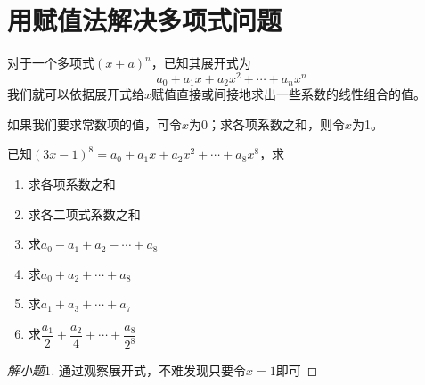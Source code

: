 \section[多项式问题]{用赋值法解决多项式问题}
对于一个多项式$(x+a)^n$，已知其展开式为\[a_0+a_1x+a_2x^2+\cdots+a_nx^n\]我们就可以依据展开式给$x$赋值直接或间接地求出一些系数的线性组合的值。

如果我们要求常数项的值，可令$x$为0；求各项系数之和，则令$x$为1。

\begin{example}
	已知$(3x-1)^8=a_0+a_1x+a_2x^2+\cdots+a_8x^8$，求

	\begin{enumerate}
		\item 求各项系数之和
		\item 求各二项式系数之和
		\item 求$a_0-a_1+a_2-\cdots+a_8$
		\item 求$a_0+a_2+\cdots+a_8$
		\item 求$a_1+a_3+\cdots+a_7$
		\item 求$\dfrac{a_1}{2}+\dfrac{a_2}{4}+\cdots+\dfrac{a_8}{2^8}$
	\end{enumerate}
\end{example}

\begin{proof}[解小题$1$]
	通过观察展开式，不难发现只要令$x=1$即可
\end{proof}
